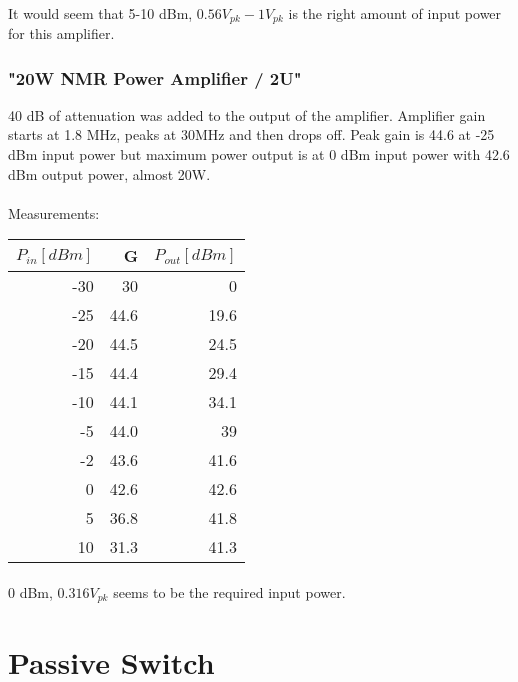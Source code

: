 \documentclass{article}
\begin{document}
\paragraph{}
It would seem that 5-10 dBm, $ 0.56V_{pk} - 1V_{pk} $ is the right amount of input power for this amplifier.

\subsubsection{"20W NMR Power Amplifier / 2U"}
    40 dB of attenuation was added to the output of the amplifier. 
    Amplifier gain starts at 1.8 MHz, peaks at 30MHz and then drops off.
    Peak gain is 44.6 at -25 dBm input power but maximum power output is at 0 dBm input power with 42.6 dBm output power, almost 20W.
    
    \paragraph{}
    Measurements:
    \begin{table}[H]
        \centering
        \begin{tabular}{|r|r|r|}
            \hline
            $ P_{in} [dBm] $ & G & $P_{out} [dBm] $ \\
            \hline 
            -30 & 30 & 0\\
            -25 & 44.6 & 19.6 \\
            -20 & 44.5 & 24.5 \\
            -15 & 44.4 & 29.4 \\
            -10 & 44.1 & 34.1 \\
            -5 & 44.0 & 39 \\
            -2 & 43.6 & 41.6 \\
            0 & 42.6 & 42.6 \\
            5 & 36.8 & 41.8 \\
            10 & 31.3 & 41.3 \\
            \hline
        \end{tabular}
        \label{tab:my_label}
    \end{table}
    
\paragraph{}
0 dBm, $0.316V_{pk}$ seems to be the required input power.

\section{Passive Switch}
\end{document}
